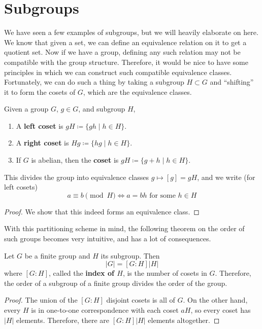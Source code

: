 \section{Subgroups} 

  We have seen a few examples of subgroups, but we will heavily elaborate on here. We know that given a set, we can define an equivalence relation on it to get a quotient set. Now if we have a group, defining any such relation may not be compatible with the group structure. Therefore, it would be nice to have some principles in which we can construct such compatible equivalence classes. Fortunately, we can do such a thing by taking a subgroup $H \subset G$ and ``shifting'' it to form the cosets of $G$, which are the equivalence classes. 
  
  \begin{definition}[Coset]
    Given a group $G$, $g \in G$, and subgroup $H$, 
    \begin{enumerate}
      \item A \textbf{left coset} is $g H \coloneqq \{g h \mid h \in H \}$. 
      \item A \textbf{right coset} is $H g \coloneqq \{h g \mid h \in H \}$. 
      \item If $G$ is abelian, then the \textbf{coset} is $gH \coloneqq \{g + h \mid h \in H\}$. 
    \end{enumerate}
    This divides the group into equivalence classes $g \mapsto [g] = gH$, and we write (for left cosets)
    \begin{equation}
      a \equiv b \pmod{H} \iff a = b h \text{ for some } h \in H
    \end{equation}
  \end{definition}
  \begin{proof}
    We show that this indeed forms an equivalence class. 
  \end{proof}

  With this partitioning scheme in mind, the following theorem on the order of such groups becomes very intuitive, and has a lot of consequences. 

  \begin{theorem}
    Let $G$ be a finite group and $H$ its subgroup. Then 
    \begin{equation}
      |G| = [G:H] |H|
    \end{equation}
    where $[G:H]$, called the \textbf{index of $H$}, is the number of cosets in $G$. Therefore, the order of a subgroup of a finite group divides the order of the group. 
  \end{theorem}
  \begin{proof}
    The union of the $[G:H]$ disjoint cosets is all of $G$. On the other hand, every $H$ is in one-to-one correspondence with each coset $aH$, so every coset has $|H|$ elements. Therefore, there are $[G:H] |H|$ elements altogether. 
  \end{proof}

